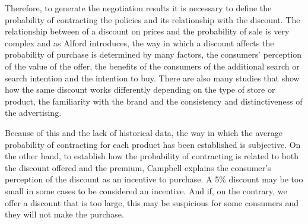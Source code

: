 \documentclass[review]{elsarticle}
\begin{document}
Therefore, to generate the negotiation results it is necessary to define the probability of contracting the policies and its relationship with the discount.
The relationship between of a discount on prices and the probability of sale is very complex and as Alford \cite{alford2002effects} introduces, the way in which a discount affects the probability of purchase is determined by many factors, the consumers' perception of the value of the offer, the benefits of the consumers of the additional search or search intention and the intention to buy. There are also many studies that show how the same discount works differently depending on the type of store or product, the familiarity with the brand and the consistency and distinctiveness of the advertising.


Because of this and the lack of historical data, the way in which the average probability of contracting for each product has been established is subjective.
On the other hand, to establish how the probability of contracting is related to both the discount offered and the premium, Campbell \cite{campbell1990framing} explains the consumer's perception of the discount as an incentive to purchase. A 5\%  discount may be too small in some cases to be considered an incentive. And if, on the contrary, we offer a discount that is too large, this may be suspicious for some consumers and they will not make the purchase.
\end{document}
